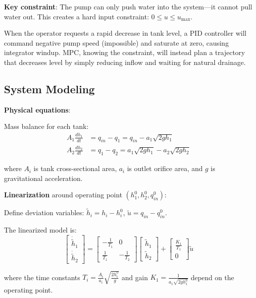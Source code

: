 \textbf{Key constraint}: The pump can only push water into the system---it cannot pull water out. This creates a hard input constraint: $0 \leq u \leq u_{\max}$.

When the operator requests a rapid decrease in tank level, a PID controller will command negative pump speed (impossible) and saturate at zero, causing integrator windup. MPC, knowing the constraint, will instead plan a trajectory that decreases level by simply reducing inflow and waiting for natural drainage.

\subsection{System Modeling}

\textbf{Physical equations}:

Mass balance for each tank:
\begin{align}
    A_1 \frac{dh_1}{dt} &= q_{in} - q_1 = q_{in} - a_1\sqrt{2gh_1} \\
    A_2 \frac{dh_2}{dt} &= q_1 - q_2 = a_1\sqrt{2gh_1} - a_2\sqrt{2gh_2}
\end{align}

where $A_i$ is tank cross-sectional area, $a_i$ is outlet orifice area, and $g$ is gravitational acceleration.

\textbf{Linearization} around operating point $(h_1^0, h_2^0, q_{in}^0)$:

Define deviation variables: $\tilde{h}_i = h_i - h_i^0$, $\tilde{u} = q_{in} - q_{in}^0$.

The linearized model is:
\begin{equation}
    \begin{bmatrix} \dot{\tilde{h}}_1 \\ \dot{\tilde{h}}_2 \end{bmatrix} =
    \begin{bmatrix} -\frac{1}{T_1} & 0 \\ \frac{1}{T_1} & -\frac{1}{T_2} \end{bmatrix}
    \begin{bmatrix} \tilde{h}_1 \\ \tilde{h}_2 \end{bmatrix} +
    \begin{bmatrix} \frac{K_1}{T_1} \\ 0 \end{bmatrix} \tilde{u}
\end{equation}

where the time constants $T_i = \frac{A_i}{a_i}\sqrt{\frac{2h_i^0}{g}}$ and gain $K_1 = \frac{1}{a_1\sqrt{2gh_1^0}}$ depend on the operating point.

